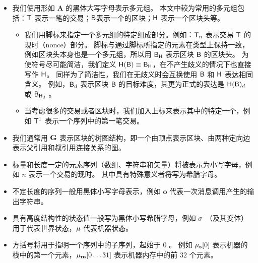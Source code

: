 \begin{itemize}[nosep]
	
	
	\item 我们使用形如  $\mathbf{A}$ 的黑体大写字母表示多元组。
	本文中较为常用的多元组包括：$\textsf{T}$ 表示一笔{\name}的交易；$\textsf{B}$表示一个{\name}的区块；$\textsf{H}$ 表示一个区块头等。
	\begin{itemize}[nosep]
		\item 我们用脚标来指定一个多元组的特定组成部分。例如：$\textsf{T}_n$ 表示交易 $\textsf{T}$ 的现时（nonce）部分。
		脚标与通过脚标所指定的元素在类型上保持一致，例如区块头本身也是一个多元组，所以用 $\textsf{B}_{\textsf{H}}$ 表示区块 $\textsf{B}$ 的区块头。
		为使符号尽可能简洁，我们定义 $\textsf{H}(\textsf{B})\equiv \textsf{B}_{\textsf{H}}$，在不产生歧义的情况下也直接写作 $\textsf{H}$。
		同样为了简洁性，我们在无歧义时会互换使用 $\textsf{B}$ 和 $\textsf{H}$ 表达相同含义。
		例如，$\textsf{B}_d$ 表示区块 $\textsf{B}$ 的目标难度，其更为正式的表达是 $\textsf{H}(\textsf{B})_d$ 或 $\textsf{B}_{\textsf{H}_d}$ 。
		
		
		\item 当考虑很多的交易或者区块时，我们加入上标来表示其中的特定一个，例如 $\textsf{T}^1$ 表示一个序列中的第一笔交易。
	\end{itemize}
	
	
	\item 我们通常用 $\textbf{G}$ 表示区块的树图结构，即一个由顶点表示区块、由两种定向边表示父引用和叔引用连接关系的图。
	
	
	\item 标量和长度一定的元素序列（数组、字符串和矢量）将被表示为小写字母，例如 $n$ 表示一个交易的现时。
	其中具有特殊意义者将写为希腊字母。
	
	
	\item 不定长度的序列一般用黑体小写字母表示，例如 $\mathbf{o}$ 代表一次消息调用产生的输出字符串。
	
	
	\item 具有高度结构性的状态值一般写为黑体小写希腊字母，例如 $\mathbf{\sigma}$ （及其变体）用于代表世界状态，$\mathbf{\mu}$ 代表机器状态。
	
	
	\item 方括号将用于指明一个序列中的子序列，起始于 $0$ 。
	例如 $\mathbf{\mu}_{\mathbf{s}}[0]$ 表示机器的栈中的第一个元素，$\mathbf{\mu}_{\mathbf{m}}[0\dots 31]$ 表示机器内存中的前 $32$ 个元素。
	

\end{itemize}
